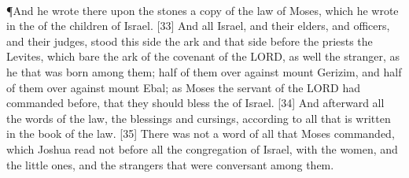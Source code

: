 \\
\P \textcolor[cmyk]{0.99998,1,0,0}{And he wrote there upon the stones a copy of the law of Moses, which he wrote in the  of the children of Israel.}
[33] \textcolor[cmyk]{0.99998,1,0,0}{And all Israel, and their elders, and officers, and their judges, stood  this side the ark and  that side before the priests the Levites, which bare the ark of the covenant of the LORD, as well the stranger, as he that was born among them; half of them over against mount Gerizim, and half of them over against mount Ebal; as Moses the servant of the LORD had commanded before, that they should bless the  of Israel.}
[34] \textcolor[cmyk]{0.99998,1,0,0}{And afterward  all the words of the law, the blessings and cursings, according to all that is written in the book of the law.}
[35] \textcolor[cmyk]{0.99998,1,0,0}{There was not a word of all that Moses commanded, which Joshua read not before all the congregation of Israel, with the women, and the little ones, and the strangers that were conversant among them.}

